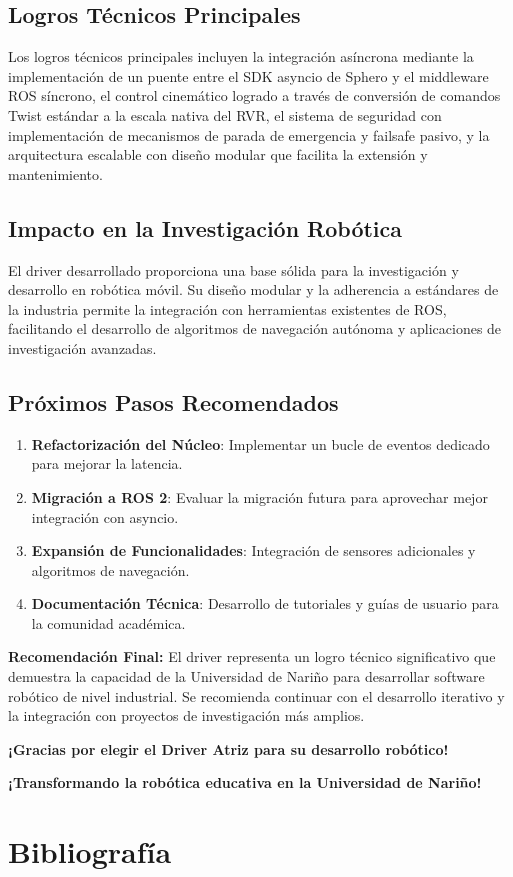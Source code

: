 \documentclass[11pt]{article}
\numberwithin{figure}{section}
\numberwithin{table}{section}
\begin{document}
\subsection{Logros Técnicos Principales}

Los logros técnicos principales incluyen la integración asíncrona mediante la implementación de un puente entre el SDK asyncio de Sphero y el middleware ROS síncrono, el control cinemático logrado a través de conversión de comandos Twist estándar a la escala nativa del RVR, el sistema de seguridad con implementación de mecanismos de parada de emergencia y failsafe pasivo, y la arquitectura escalable con diseño modular que facilita la extensión y mantenimiento.


\subsection{Impacto en la Investigación Robótica}

El driver desarrollado proporciona una base sólida para la investigación y desarrollo en robótica móvil. Su diseño modular y la adherencia a estándares de la industria permite la integración con herramientas existentes de ROS, facilitando el desarrollo de algoritmos de navegación autónoma y aplicaciones de investigación avanzadas.


\subsection{Próximos Pasos Recomendados}

\begin{enumerate}
    \item \textbf{Refactorización del Núcleo}: Implementar un bucle de eventos dedicado para mejorar la latencia.
    \item \textbf{Migración a ROS 2}: Evaluar la migración futura para aprovechar mejor integración con asyncio.
    \item \textbf{Expansión de Funcionalidades}: Integración de sensores adicionales y algoritmos de navegación.
    \item \textbf{Documentación Técnica}: Desarrollo de tutoriales y guías de usuario para la comunidad académica.
\end{enumerate}

\begin{infobox}
\textbf{Recomendación Final:} El driver representa un logro técnico significativo que demuestra la capacidad de la Universidad de Nariño para desarrollar software robótico de nivel industrial. Se recomienda continuar con el desarrollo iterativo y la integración con proyectos de investigación más amplios.
\end{infobox}

\vspace{1cm}
\begin{center}
\textbf{\color{darkblue}¡Gracias por elegir el Driver Atriz para su desarrollo robótico!}

\textbf{\color{darkblue}¡Transformando la robótica educativa en la Universidad de Nariño!}
\end{center}


\newpage


\section{Bibliografía}


\printbibliography
\end{document}
